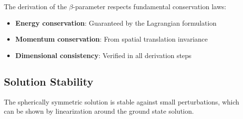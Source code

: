	The derivation of the $\beta$-parameter respects fundamental conservation laws:
	\begin{itemize}
		\item \textbf{Energy conservation}: Guaranteed by the Lagrangian formulation
		\item \textbf{Momentum conservation}: From spatial translation invariance
		\item \textbf{Dimensional consistency}: Verified in all derivation steps
	\end{itemize}
	
	\subsection{Solution Stability}
	\label{subsec:solution_stability}
	
	The spherically symmetric solution is stable against small perturbations, which can be shown by linearization around the ground state solution.

